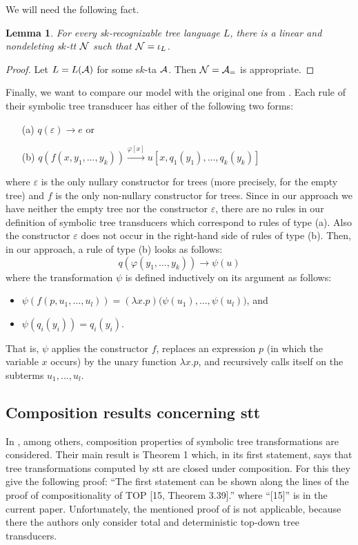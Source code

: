 \documentclass[10pt]{scrartcl}
\newtheorem{lm}[df]{Lemma}
\newcommand{\A}{{\cal A}}
\newcommand{\N}{{\cal N}}
\begin{document}
We will need the following fact.


\begin{lm}\rm \label{ln-lemma} For every s$k$-recognizable tree language $L$, there is a linear and nondeleting s$k$-tt $\N$ such that $\N = \iota_{L}$.
\end{lm} 
\begin{proof} Let $L=L(\A)$ for some s$k$-ta $\A$. Then $\N=\A_{=}$ is appropriate.
\end{proof}

Finally, we want to compare our model with the original one from \cite{veabjo11b}. Each rule of their symbolic tree transducer has either
of the following two forms:
\begin{enumerate}
\item[(a)] $q(\varepsilon) \rightarrow e$ or
\item[(b)] $q(f(x,y_1,\ldots,y_k)) \stackrel{\varphi[x]}{\longrightarrow} u[x,q_1(y_1),\ldots,q_k(y_k)]$
\end{enumerate}
where $\varepsilon$ is the only nullary constructor for trees (more precisely, for the empty tree)  and $f$ is the only non-nullary constructor for trees. Since in our
approach we have neither the empty tree nor the constructor
$\varepsilon$, there are no rules in our definition of symbolic tree
transducers which correspond to rules of type (a). Also the constructor
$\varepsilon$ does not occur in the right-hand side of rules of type
(b). Then, in our approach, a rule of type (b) looks as follows:
\[
q(\varphi(y_1,\ldots,y_k)) \rightarrow \psi(u)
\]
where the transformation $\psi$ is defined inductively on its argument as follows:
\begin{itemize}
\item $\psi(f(p,u_1,\ldots,u_l)) = (\lambda x. p)\big(
  \psi(u_1),\ldots,\psi(u_l)\big)$, and
\item $\psi(q_i(y_i)) = q_i(y_i)$.
\end{itemize}
That is, $\psi$ applies the constructor $f$, replaces an expression
$p$ (in which the variable $x$ occurs) by the unary function $\lambda
x.p$, and recursively calls itself on the subterms $u_1,\ldots,u_l$. 






\subsection{Composition results concerning stt}

In \cite{veabjo11b}, among others, composition properties of symbolic
tree transformations are considered. Their main result is Theorem 1
which, in its first statement, says that tree transformations computed by  stt are
closed under composition. For this they give the following  proof: ``The first statement can be shown along the lines of
the proof of compositionality of TOP [15, Theorem 3.39].'' where
``[15]'' is \cite{fulvog98} in the current paper. Unfortunately, the
mentioned proof of \cite{fulvog98} is not applicable, because there
the authors only consider total and deterministic top-down tree
transducers. 
\end{document}
